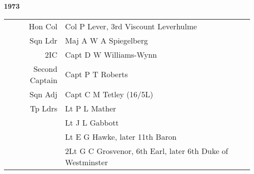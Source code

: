 \begin{center}
  \Huge
  \textbf{1973}
\end{center}

\begin{center}
  \small
  \begin{tabular}{rl}
    Hon Col & Col P Lever, 3rd Viscount Leverhulme \\
    Sqn Ldr & Maj A W A Spiegelberg \\
    2IC & Capt D W Williams-Wynn \\
    Second Captain & Capt P T Roberts \\
    Sqn Adj & Capt C M Tetley (16/5L) \\
    Tp Ldrs & Lt P L Mather \\
      & Lt J L Gabbott \\
      & Lt E G Hawke, later 11th Baron \\
      & 2Lt G C Grosvenor, 6th Earl, later 6th Duke of Westminster \\
  \end{tabular}
\end{center}

